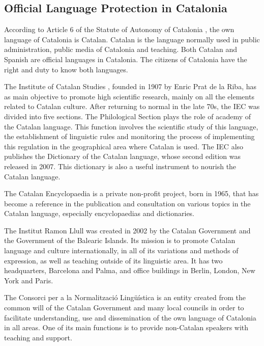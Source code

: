 \begin{multicols}{2}
\subsection{Official Language Protection in Catalonia}

According to Article 6 of the Statute of Autonomy of Catalonia \cite{CAT-estatut}, the own language of Catalonia is Catalan. Catalan is the language normally used in public administration, public media of Catalonia and teaching. Both Catalan and Spanish are official languages in Catalonia. The citizens of Catalonia have the right and duty to know both languages.


The Institute of Catalan Studies \cite{CAT-IEC}, founded in 1907 by Enric Prat de la Riba, has as main objective to promote high scientific research, mainly on all the elements related to Catalan culture. After returning to normal in the late 70s, the IEC was divided into five sections. The Philological Section plays the role of academy of the Catalan language. This function involves the scientific study of this language, the establishment of linguistic rules and monitoring the process of implementing this regulation in the geographical area where Catalan is used. The IEC also publishes the Dictionary of the Catalan language, whose second edition was released in 2007. This dictionary is also a useful instrument to nourish the Catalan language.

The Catalan Encyclopaedia \cite{CAT-enciclopedia} is a private non-profit project, born in 1965, that has become a reference in the publication and consultation on various topics in the Catalan language, especially encyclopaedias and dictionaries.

The Institut Ramon Llull \cite{CAT-Nota12} was created in 2002 by the Catalan Government and the Government of the Balearic Islands. Its mission is to promote Catalan language and culture internationally, in all of its variations and methods of expression, as well as teaching outside of its linguistic area. It has two headquarters, Barcelona and Palma, and office buildings in Berlin, London, New York and Paris.

The Consorci per a la Normalització Lingüística \cite{CAT-cpnl} is an entity created from the common will of the Catalan Government and many local councils in order to facilitate understanding, use and dissemination of the own language of Catalonia in all areas. One of its main functions is to provide non-Catalan speakers with teaching and support.


\end{multicols}
